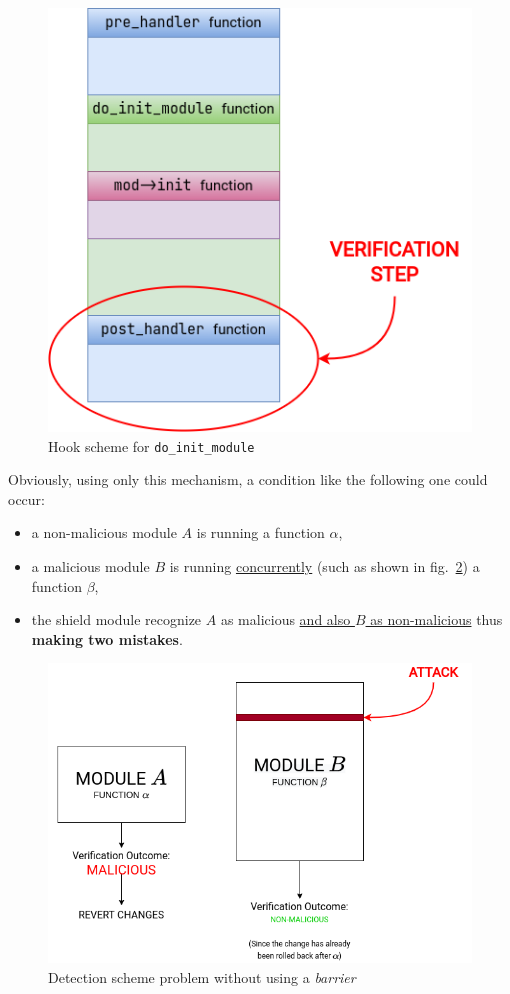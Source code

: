 \documentclass{article}
\begin{document}
	\begin{figure}[!htbp]
		\centering
		\includegraphics[scale=0.4]{monitoring}
		\caption{Hook scheme for \texttt{do\_init\_module}}
		\label{fig:monitoring}
	\end{figure}

	Obviously, using only this mechanism, a condition like the following one could occur:
	\begin{itemize}
		\item a non-malicious module $A$ is running a function $\alpha$,
		\item a malicious module $B$ is running \ul{concurrently} (such as shown in fig.~\ref{fig:concurrency}) a
		function $\beta$,
		\item the shield module recognize $A$ as malicious \ul{and also $B$ as non-malicious} thus \textbf{making two
		mistakes}.
	\end{itemize}

	\begin{figure}[!htbp]
		\centering
		\includegraphics[scale=0.4]{concurrency}
		\caption{Detection scheme problem without using a \textit{barrier}}
		\label{fig:concurrency}
	\end{figure}
\end{document}
